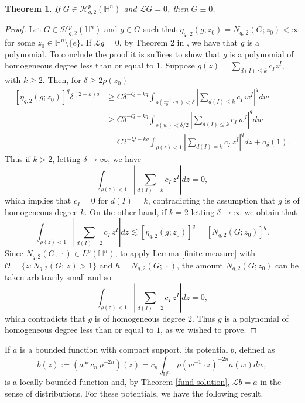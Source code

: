 \documentclass[reqno,10pt]{article}
\newtheorem{theorem}{Theorem}
\theoremstyle{definition}
\numberwithin{equation}{section}
\numberwithin{theorem}{section}
\begin{document}
\begin{theorem} \label{L 1-1}
If $G \in \mathcal{H}^{p}_{q, 2}(\mathbb{H}^{n})$ and $\mathcal{L} G = 0$, then $G \equiv 0$.
\end{theorem}

\begin{proof} Let $G \in \mathcal{H}^{p}_{q, 2}(\mathbb{H}^{n})$ and $g \in G$ such that 
$\eta_{q, \, 2}(g; z_0) = N_{q, \, 2}(G; z_0) < \infty$ for some $z_0 \in \mathbb{H}^n \setminus \{ e \}$. If $\mathcal{L} g = 0$, by 
Theorem 2 in \cite{Geller}, we have that $g$ is a polynomial. To conclude the proof it is suffices to show that $g$ is a polynomial of homogeneous degree less than or equal to $1$. Suppose $g(z) = \displaystyle{\sum_{d(I) \leq k} c_I z^I}$, with $k \geq 2$. Then, for 
$\delta \geq 2 \rho(z_0)$
\begin{equation*}
\begin{split}
[\eta_{q, 2}(g; z_0)]^q  \delta^{(2-k)q} & \geq C \delta^{-Q - kq} \int_{\rho(z_0^{-1} \cdot w) < \delta} \left|\sum_{d(I) \leq k} c_I \, 
w^I \right|^q dw \\
& \geq C \delta^{-Q - kq} \int_{\rho(w) < \delta/2} \left|\sum_{d(I) \leq k} c_I \, w^I \right|^q dw \\
& = C 2^{-Q - kq} \int_{\rho(z) < 1} \left|\sum_{d(I) = k} c_I \, z^I \right|^q dz + o_{\delta}(1).
\end{split}
\end{equation*}
Thus if $k > 2$, letting $\delta \to \infty$, we have
\[
\int_{\rho(z) < 1} \left|\sum_{d(I) = k} c_I \, z^I \right| dz = 0,
\]
which implies that $c_I=0$ for $d(I)=k$, contradicting the assumption that $g$ is of homogeneous degree $k$. On the other hand, if $k=2$ letting $\delta \to \infty$ we obtain that
\[
\int_{\rho(z) < 1} \left|\sum_{d(I) = 2} c_I \, z^I \right| dz \lesssim [\eta_{q, 2}(g; z_0)]^q = [N_{q, 2}(G; z_0)]^q.
\]
Since $N_{q, 2}(G; \, \cdot) \in L^p(\mathbb{H}^n)$, to apply Lemma \ref{finite measure} with 
$\mathcal{O} = \{ z : N_{q, 2}(G; \, z) > 1 \}$ and $h = N_{q, 2}(G; \, \cdot)$, the amount $N_{q, 2}(G; z_0)$ can be taken arbitrarily small and so
\[
\int_{\rho(z) < 1} \left|\sum_{d(I) = 2} c_I \, z^I \right| dz = 0,
\]
which contradicts that $g$ is of homogeneous degree $2$. Thus $g$ is a polynomial of homogeneous degree less than or equal to $1$, as we wished to prove. 
\end{proof}

If $a$ is a bounded function with compact support, its potential $b$, defined as 
\[
b(z) := \left( a \ast c_n \, \rho^{-2n} \right)(z) = c_n \int_{\mathbb{H}^{n}} \rho(w^{-1} \cdot z)^{-2n} a(w) dw,
\]
is a locally bounded function and, by Theorem \ref{fund solution}, $\mathcal{L} b = a$ in the sense of distributions. For these potentials, we have the following result.
\end{document}
